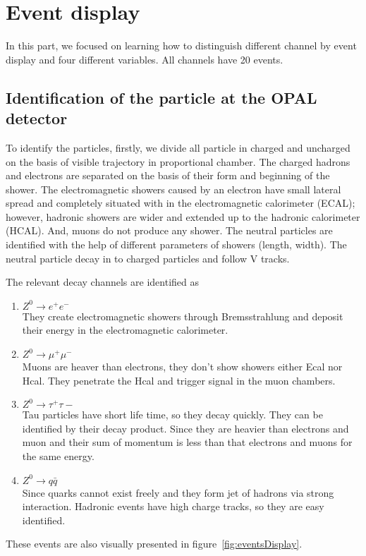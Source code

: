 \clearpage
\section{Event display}
In this part, we focused on learning how to distinguish different channel by event display and four different variables. All channels have 20 events. 



\subsection{Identification of the particle at the OPAL detector}
To identify the particles, firstly, we divide all particle in charged and uncharged on the basis of visible trajectory in proportional chamber.
The charged hadrons and electrons are separated on the basis of their form and beginning of the shower. The electromagnetic showers caused by an electron have small lateral spread and completely situated with in the electromagnetic calorimeter (ECAL); however, hadronic showers are wider and extended up to the hadronic calorimeter (HCAL). And, muons do not produce any shower.
The neutral particles are identified with the help of different parameters of showers (length, width). The neutral particle decay in to charged particles and follow V tracks.
 

The relevant decay channels are identified as
\begin{enumerate}
\item $ {Z}^0\rightarrow e^+e^- $\\
They create electromagnetic showers through Bremsstrahlung and deposit their energy in the electromagnetic calorimeter. 

\item $ {Z}^0\rightarrow \mu^+\mu^- $\\ 
Muons are heaver than electrons, they don't show showers either Ecal nor Hcal. They penetrate the Hcal and trigger signal in the muon chambers.

\item $ {Z}^0\rightarrow \tau^+\tau-$\\
Tau particles have short life time, so they decay quickly. They can be identified by their decay product. Since they are heavier than electrons and muon and their sum of momentum is less than that electrons and muons for the same energy.

\item $ {Z}^0\rightarrow q\bar{q}$\\
Since quarks cannot exist freely and they form jet of hadrons via strong interaction. Hadronic events have high charge tracks, so they are easy identified.
\end{enumerate}
These events are also visually presented in figure~\ref{fig:eventsDisplay}.

